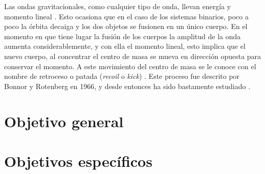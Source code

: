 	Las ondas gravitacionales, como cualquier tipo de onda, llevan energ\'ia y momento lineal \cite{hughes2005black}. Esto ocasiona que en el caso de los sistemas binarios, poco a poco la \'orbita decaiga y los dos objetos se fusionen en un \'unico cuerpo. En el momento en que tiene lugar la fusi\'on de los cuerpos la amplitud de la onda aumenta considerablemente, y con ella el momento lineal, esto implica que el nuevo cuerpo, al concentrar el centro de masa se mueva en direcci\'on opuesta para conservar el momento. A este movimiento del centro de masa se le conoce con el nombre de retroceso o patada (\textit{recoil} o \textit{kick}) \cite{hughes2005black}. Este proceso fue descrito por Bonnor y Rotenberg en 1966, y desde entonces ha sido bastamente estudiado \cite{bonnor1966gravitational}.
	
	
\section{Objetivo general}
		
\section{Objetivos específicos}
%


